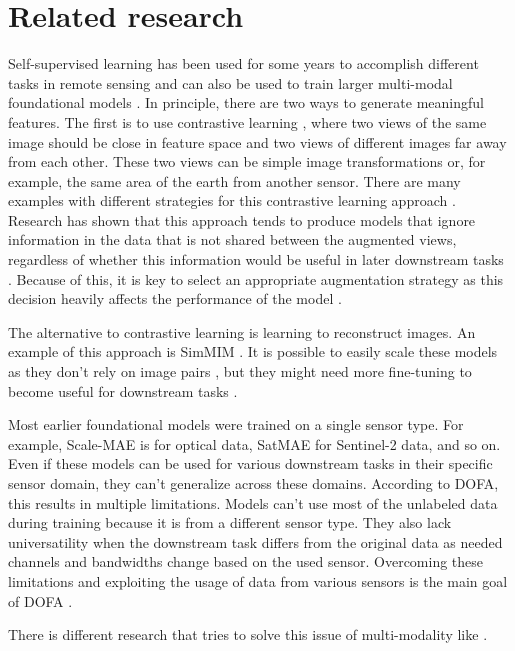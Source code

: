 \section{Related research}
\label{sec:related}



Self-supervised learning has been used for some years to accomplish different tasks in remote sensing and can also be used to train larger multi-modal foundational models \cite{dofa, satmae, croma}.
In principle, there are two ways to generate meaningful features. The first is to use contrastive learning \cite{chen2020simpleframeworkcontrastivelearning}, where two views of the same image should be close in feature space and two views of different images far away from each other. These two views can be simple image transformations or, for example, the same area of the earth from another sensor.
There are many examples with different strategies for this contrastive learning approach \cite{satmae, ayush2022geographyawareselfsupervisedlearning, manas2021seasonalcontrastunsupervisedpretraining}.
Research has shown that this approach tends to produce models that ignore information in the data that is not shared between the augmented views, regardless of whether this information would be useful in later downstream tasks \cite{tian2020makesgoodviewscontrastive}.
Because of this, it is key to select an appropriate augmentation strategy as this decision heavily affects the performance of the model \cite{neumann2019indomainrepresentationlearningremote}.

The alternative to contrastive learning is learning to reconstruct images. An example of this approach is SimMIM \cite{xie2022simmimsimpleframeworkmasked}.
It is possible to easily scale these models as they don't rely on image pairs \cite{he2021maskedautoencodersscalablevision},
but they might need more fine-tuning to become useful for downstream tasks \cite{lehner2023contrastivetuninglittlehelp}.

Most earlier foundational models were trained on a single sensor type. For example, Scale-MAE \cite{scalemae} is for optical data, SatMAE \cite{satmae} for Sentinel-2 data, and so on. Even if these models can be used for various downstream tasks in their specific sensor domain, they can't generalize across these domains. According to DOFA, this results in multiple limitations. Models can't use most of the unlabeled data during training because it is from a different sensor type. They also lack universatility when the downstream task differs from the original data as needed channels and bandwidths change based on the used sensor. Overcoming these limitations and exploiting the usage of data from various sensors is the main goal of DOFA \cite{dofa}.

There is different research that tries to solve this issue of multi-modality like \cite{croma, tseng2024lightweightpretrainedtransformersremote, hackstein2024exploringmaskedautoencoderssensoragnostic}.
